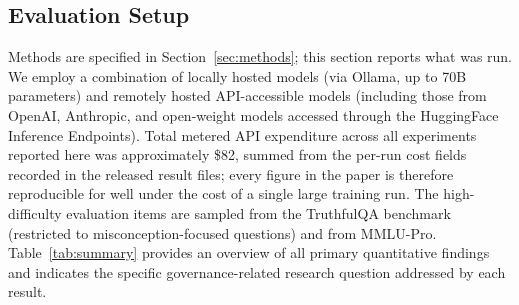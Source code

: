\documentclass[manuscript,screen,review]{acmart}
\begin{document}
\subsection{Evaluation Setup}
Methods are specified in Section~\ref{sec:methods}; this section reports what was run. We employ a combination of locally hosted models (via Ollama, up to 70B parameters) and remotely hosted API-accessible models (including those from OpenAI, Anthropic, and open-weight models accessed through the HuggingFace Inference Endpoints). Total metered API expenditure across all experiments reported here was approximately \$82, summed from the per-run cost fields recorded in the released result files; every figure in the paper is therefore reproducible for well under the cost of a single large training run. The high-difficulty evaluation items are sampled from the TruthfulQA benchmark (restricted to misconception-focused questions) and from MMLU-Pro. Table~\ref{tab:summary} provides an overview of all primary quantitative findings and indicates the specific governance-related research question addressed by each result.
\end{document}
